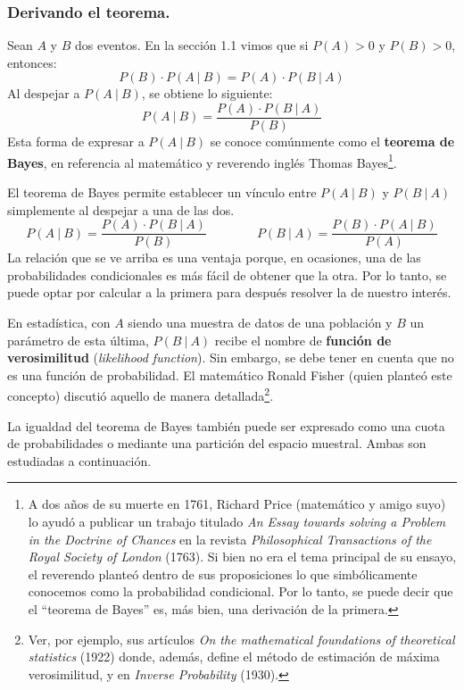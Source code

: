 \documentclass[12pt]{article}
\begin{document}
\subsubsection{Derivando el teorema.}

Sean $A$ y $B$ dos eventos. En la sección 1.1 vimos que si $P(A) > 0$ y $P(B) > 0$, entonces:
\[
  P(B) \cdot P(A \ | \ B) = P(A) \cdot P(B \ | \ A)
\]
Al despejar a $P(A \ | \ B)$, se obtiene lo siguiente:
\[
  P(A \ | \ B) = \frac{P(A) \cdot P(B \ | \ A)}{P(B)}
\]
Esta forma de expresar a $P(A \ | \ B)$ se conoce comúnmente como el \textbf{teorema de Bayes}, en referencia al matemático y reverendo inglés Thomas Bayes\footnote{A dos años de su muerte en 1761, Richard Price (matemático y amigo suyo) lo ayudó a publicar un trabajo titulado \textit{An Essay towards solving a Problem in the Doctrine of Chances} en la revista \textit{Philosophical Transactions of the Royal Society of London} (1763). Si bien no era el tema principal de su ensayo, el reverendo planteó dentro de sus proposiciones lo que simbólicamente conocemos como la probabilidad condicional. Por lo tanto, se puede decir que el ``teorema de Bayes'' es, más bien, una derivación de la primera.}.

El teorema de Bayes permite establecer un vínculo entre $P(A \ | \ B)$ y $P(B \ | \ A)$ simplemente al despejar a una de las dos.
\[
  P(A \ | \ B) = \frac{P(A) \cdot P(B \ | \ A)}{P(B)} \qquad \qquad
  P(B \ | \ A) = \frac{P(B) \cdot P(A \ | \ B)}{P(A)}
\]
La relación que se ve arriba es una ventaja porque, en ocasiones, una de las probabilidades condicionales es más fácil de obtener que la otra. Por lo tanto, se puede optar por calcular a la primera para después resolver la de nuestro interés.

En estadística, con $A$ siendo una muestra de datos de una población y $B$ un parámetro de esta última, $P(B \ | \ A)$ recibe el nombre de \textbf{función de verosimilitud} (\textit{likelihood function}). Sin embargo, se debe tener en cuenta que no es una función de probabilidad. El matemático Ronald Fisher (quien planteó este concepto) discutió aquello de manera detallada\footnote{Ver, por ejemplo, sus artículos \textit{On the mathematical foundations of theoretical statistics} (1922) donde, además, define el método de estimación de máxima verosimilitud, y en \textit{Inverse Probability} (1930).}.

La igualdad del teorema de Bayes también puede ser expresado como una cuota de probabilidades o mediante una partición del espacio muestral. Ambas son estudiadas a continuación.
\end{document}
